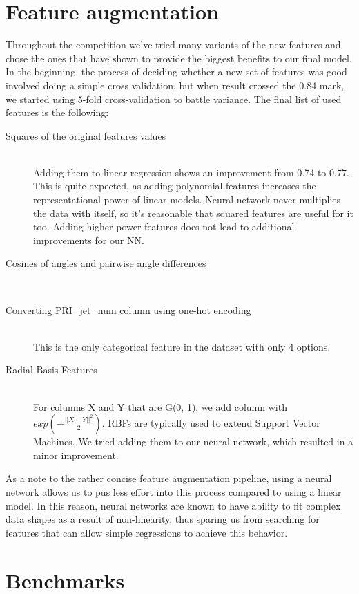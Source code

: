 \documentclass[10pt,conference,compsocconf]{IEEEtran}
\begin{document}
\section{Feature augmentation}
Throughout the competition we've tried many variants of the new features and chose the ones that have shown to provide the biggest benefits to our final model. In the beginning, the process of deciding whether a new set of features was good involved doing a simple cross validation, but when result crossed the 0.84 mark, we started using 5-fold cross-validation to battle variance. The final list of used features is the following:
\begin{description}
\item[Squares of the original features values] \ \\
	Adding them to linear regression shows an improvement from 0.74 to 0.77. This is quite expected, as adding polynomial features increases the representational power of linear models. Neural network never multiplies the data with itself, so it's reasonable that squared features are useful for it too. Adding higher power features does not lead to additional improvements for our NN.
	
\item[Cosines of angles and pairwise angle differences] \ \\
	
\item[Converting PRI\_jet\_num column using one-hot encoding] \ \\
	This is the only categorical feature in the dataset with only 4 options.
	
\item[Radial Basis Features] \ \\
	For columns X and Y that are G(0, 1), we add column with $exp(-\frac{||X-Y||^2}{2})$.
	RBFs \cite{rbf_book} \cite{rbf_wiki} are typically used to extend Support Vector Machines. We tried adding them to our neural network, which resulted in a minor improvement.
\end{description}

As a note to the rather concise feature augmentation pipeline, using a neural network allows us to pus less effort into this process compared to using a linear model. In this reason, neural networks are known to have ability to fit complex data shapes as a result of non-linearity, thus sparing us from searching for features that can allow simple regressions to achieve this behavior.

\section{Benchmarks}
\end{document}
